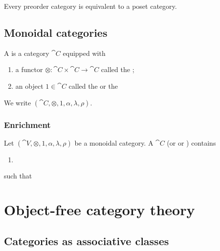 \begin{lemma}
Every preorder category is equivalent to a poset category.
\end{lemma}



\section{Monoidal categories}
\begin{definition}
A  is a category $\cat{C}$ equipped with
\begin{enumerate}
\item a functor $\otimes: \cat{C}\times\cat{C} \to \cat{C}$ called the ;
\item an object $1\in \cat{C}$ called the  or the 
\end{enumerate}
We write $(\cat{C}, \otimes, 1, \alpha, \lambda, \rho)$.
\end{definition}

\subsection{Enrichment}
\begin{definition}
Let $(\cat{V}, \otimes, 1, \alpha, \lambda, \rho)$ be a monoidal category. A  $\cat{C}$ (or  or ) contains
\begin{enumerate}
\item 
\end{enumerate}
such that
\end{definition}

\chapter{Object-free category theory}

\section{Categories as associative classes}
